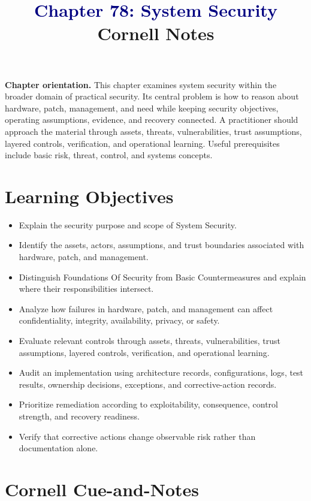 \documentclass[11pt]{article}
\title{\textcolor{Navy}{Chapter 78: System Security}\\[2mm]\large Cornell Notes}
\author{}
\date{}
\begin{document}
\maketitle
\thispagestyle{fancy}
\vspace{-1.5em}
\begin{orientationbox}
\textbf{Chapter orientation.} This chapter examines system security within the broader domain of practical security. Its central problem is how to reason about hardware, patch, management, and need while keeping security objectives, operating assumptions, evidence, and recovery connected. A practitioner should approach the material through assets, threats, vulnerabilities, trust assumptions, layered controls, verification, and operational learning. Useful prerequisites include basic risk, threat, control, and systems concepts.
\end{orientationbox}
\section*{Learning Objectives}
\begin{itemize}
\item Explain the security purpose and scope of System Security.
\item Identify the assets, actors, assumptions, and trust boundaries associated with hardware, patch, and management.
\item Distinguish Foundations Of Security from Basic Countermeasures and explain where their responsibilities intersect.
\item Analyze how failures in hardware, patch, and management can affect confidentiality, integrity, availability, privacy, or safety.
\item Evaluate relevant controls through assets, threats, vulnerabilities, trust assumptions, layered controls, verification, and operational learning.
\item Audit an implementation using architecture records, configurations, logs, test results, ownership decisions, exceptions, and corrective-action records.
\item Prioritize remediation according to exploitability, consequence, control strength, and recovery readiness.
\item Verify that corrective actions change observable risk rather than documentation alone.
\end{itemize}
\section*{Cornell Cue-and-Notes}
\end{document}
